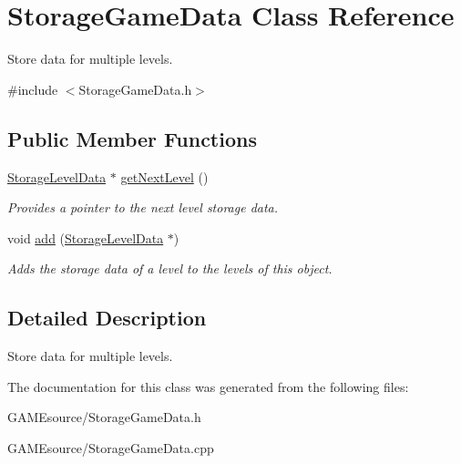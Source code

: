 \hypertarget{class_storage_game_data}{}\section{Storage\+Game\+Data Class Reference}
\label{class_storage_game_data}


Store data for multiple levels.  




{\ttfamily \#include $<$Storage\+Game\+Data.\+h$>$}

\subsection*{Public Member Functions}
\begin{DoxyCompactItemize}
\item 
\mbox{\label{class_storage_game_data_ad1fd5ccb17b058a962da24ad540f1c07}} 
\mbox{\hyperlink{class_storage_level_data}{Storage\+Level\+Data}} $\ast$ \mbox{\hyperlink{class_storage_game_data_ad1fd5ccb17b058a962da24ad540f1c07}{get\+Next\+Level}} ()
\begin{DoxyCompactList}\small\item\em Provides a pointer to the next level storage data. \end{DoxyCompactList}\item 
\mbox{\label{class_storage_game_data_a70a32ba6ae47656e3c66a33cf7ab41d4}} 
void \mbox{\hyperlink{class_storage_game_data_a70a32ba6ae47656e3c66a33cf7ab41d4}{add}} (\mbox{\hyperlink{class_storage_level_data}{Storage\+Level\+Data}} $\ast$)
\begin{DoxyCompactList}\small\item\em Adds the storage data of a level to the levels of this object. \end{DoxyCompactList}\end{DoxyCompactItemize}


\subsection{Detailed Description}
Store data for multiple levels. 

The documentation for this class was generated from the following files\+:\begin{DoxyCompactItemize}
\item 
G\+A\+M\+Esource/Storage\+Game\+Data.\+h\item 
G\+A\+M\+Esource/Storage\+Game\+Data.\+cpp\end{DoxyCompactItemize}
